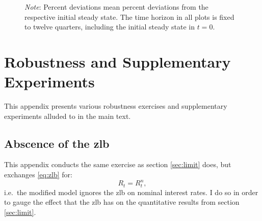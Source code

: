 \documentclass[a4paper,12pt]{article} %
\numberwithin{equation}{section} %
\numberwithin{figure}{section}
\numberwithin{table}{section}
\begin{document}
\begin{refsection}
\begin{appendices}
\begin{figure}[H]
     \vspace{10pt}

     \begin{flushleft}
     \footnotesize
	\textit{Note}: Percent deviations mean percent deviations from the respective initial steady state. The time horizon in all plots is fixed to twelve quarters, including the initial steady state in $t=0$.
	\end{flushleft}
\end{figure}

\section{Robustness and Supplementary Experiments}
\label{sec-app:robust}

This appendix presents various robustness exercises and supplementary experiments alluded to in the main text.

\subsection{Abscence of the \Gls{zlb}}
\label{sec-app:robust-no-zlb}

This appendix conducts the same exercise as section \ref{sec:limit} does, but exchanges \eqref{eq:zlb} for:
\begin{equation}
    R_t = R^n_t, \label{eq:no-zlb}
\end{equation}
i.e.~the modified model ignores the \Gls{zlb} on nominal interest rates. I do so in order to gauge the effect that the \Gls{zlb} has on the quantitative results from section \ref{sec:limit}.


\end{appendices}
\end{refsection}
\end{document}
